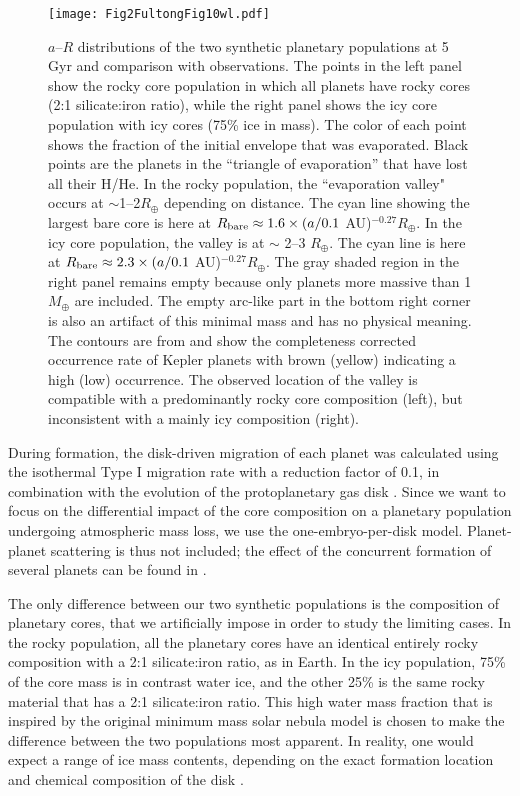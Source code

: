 \documentclass[]{emulateapj}
\def\rearth{R_{\oplus}}
\begin{document}
\begin{figure*}
\begin{center}
 \texttt{[image: Fig2FultongFig10wl.pdf]}
 \caption{$a$--$R$ distributions of the two synthetic planetary populations at 5 Gyr and comparison with observations. The points in the left panel show the rocky core population in which all planets have rocky cores (2:1 silicate:iron ratio), while the right panel shows the icy core population with icy cores (75\%  ice  in mass). The color of each point shows the fraction of the initial envelope that was evaporated. Black points are the planets in the ``triangle of evaporation'' that have lost all their  H/He. In the rocky population, the ``evaporation valley" occurs at $\sim$1--2$\rearth$ depending on distance. The cyan line showing the largest bare core is here at $R_{\rm bare}\approx1.6\times (a/0.1\ $AU)$^{-0.27} \rearth$. In the icy core population, the valley is at $\sim$ 2--3 $R_{\oplus}$. The cyan line is here at $R_{\rm bare}\approx2.3\times (a/0.1 \ $AU)$^{-0.27} \rearth$. The gray shaded region in the right panel remains empty because only planets more massive than 1 $M_{\oplus}$ are included. The empty arc-like part in the  bottom right corner is also an artifact of this minimal mass and has no physical meaning. The contours are from \citet{Fulton2017} and show the completeness corrected occurrence rate of Kepler planets with brown (yellow) indicating a high (low) occurrence. The observed location of the valley is compatible with a predominantly rocky core composition (left), but inconsistent with a mainly icy composition (right).}
  \label{twopop}
  \end{center}
\end{figure*}

During formation, the disk-driven migration of each planet was calculated using the isothermal Type I migration rate \citep{Tanaka2002} with a reduction factor of 0.1, in combination with the evolution of the protoplanetary gas disk \citep{Alibert2005,Mordasini2012a,Mordasini2012b}. Since we want to focus on the differential impact of the core composition on a planetary population undergoing atmospheric mass loss, we use the one-embryo-per-disk model. Planet-planet scattering is thus not included; the effect of the concurrent formation of several planets can be found in \citet{Alibert2013}.

The only difference between our two synthetic populations is the composition of planetary cores, that we artificially impose in order to study the limiting cases. In the rocky population, all the planetary cores have an identical entirely rocky composition with a 2:1 silicate:iron ratio, as in Earth. In the icy population, 75\% of the core mass is in contrast water ice, and the other 25\% is the same rocky material that has a 2:1 silicate:iron ratio. This high water mass fraction that is inspired by the original \citet{Hayashi1981} minimum mass solar nebula model is chosen to make the difference between the two populations most apparent. In reality, one would expect a range of ice mass contents, depending on the exact formation location and chemical composition of the disk \citep[e.g.,][]{Mordasini2016}.
\end{document}
